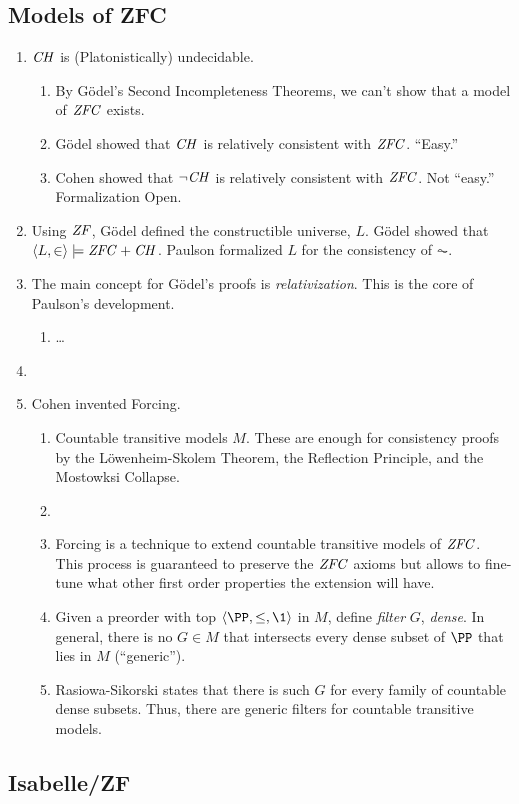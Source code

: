 \subsection{Models of ZFC}
\begin{enumerate}
\item $\mathit{CH}$ is (Platonistically) undecidable.
  \begin{enumerate}
  \item By G\"odel's Second Incompleteness Theorems, we can't show
    that a model of $\mathit{ZFC}$ exists.
  \item G\"odel showed that $\mathit{CH}$ is relatively consistent with
    $\mathit{ZFC}$. ``Easy.''
  \item Cohen showed that  $\neg\mathit{CH}$ is relatively consistent with
    $\mathit{ZFC}$. Not ``easy.'' Formalization Open.
  \end{enumerate}
\item Using $\mathit{ZF}$, G\"odel defined the constructible universe,
  $L$. G\"odel showed that $\langle L,\in\rangle\models \mathit{ZFC}+\mathit{CH}$. Paulson formalized $L$
  for the consistency of $\AC$.
\item The main concept for G\"odel's proofs is
  \emph{relativization}. This is the core of Paulson's development.
  \begin{enumerate}
  \item \dots
  \end{enumerate}
\item 
\item Cohen invented Forcing.
  \begin{enumerate}
  \item Countable transitive models $M$. These are enough for consistency
    proofs by the L\"owenheim-Skolem Theorem, the Reflection
    Principle, and the Mostowksi Collapse.
  \item 
  \item Forcing is a technique to extend countable transitive models of
    $\mathit{ZFC}$. This process is guaranteed to preserve the $\mathit{ZFC}$
    axioms but allows to fine-tune what other first order properties the
    extension will have. 
  \item Given a preorder with top $\lb\PP,\leq,\1\rb$ in $M$, define
    \emph{filter} $G$, \emph{dense}. In general, there is no  $G\in M$
    that intersects every dense
    subset of $\PP$ that lies in $M$ (``generic'').
  \item Rasiowa-Sikorski states that there is such $G$ for every
    family of countable dense subsets. Thus, there are generic filters
    for countable transitive models.
  \end{enumerate}

\end{enumerate}

\subsection{Isabelle/ZF}



